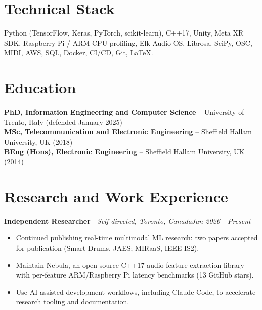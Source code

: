 \documentclass[11pt]{article}
\newenvironment{cvrole}[5]{%
  \par\noindent\textbf{\large #1} | \textit{\small #2, #3}\hfill \textit{\small #4 - #5}\par
  \begin{itemize}[leftmargin=2em, itemsep=-0.3em, topsep=-0.5em]%
}{%
  \end{itemize}\par\noindent\mbox{}\par\vspace{0.1em}%
}
\begin{document}
\section*{Technical Stack}
Python (TensorFlow, Keras, PyTorch, scikit-learn), C++17, Unity, Meta XR SDK, Raspberry Pi / ARM CPU profiling, Elk Audio OS, Librosa, SciPy, OSC, MIDI, AWS, SQL, Docker, CI/CD, Git, LaTeX.

\section*{Education}
\textbf{PhD, Information Engineering and Computer Science} -- University of Trento, Italy (defended January 2025)\\
\textbf{MSc, Telecommunication and Electronic Engineering} -- Sheffield Hallam University, UK (2018)\\
\textbf{BEng (Hons), Electronic Engineering} -- Sheffield Hallam University, UK (2014)

\section*{Research and Work Experience}

\begin{cvrole}{Independent Researcher}{Self-directed}{Toronto, Canada}{Jan 2026}{Present}
  \item Continued publishing real-time multimodal ML research: two papers accepted for publication (Smart Drums, JAES; MIRaaS, IEEE IS2).
  \item Maintain Nebula, an open-source C++17 audio-feature-extraction library with per-feature ARM/Raspberry Pi latency benchmarks (13 GitHub stars).
  \item Use AI-assisted development workflows, including Claude Code, to accelerate research tooling and documentation.
\end{cvrole}
\end{document}
